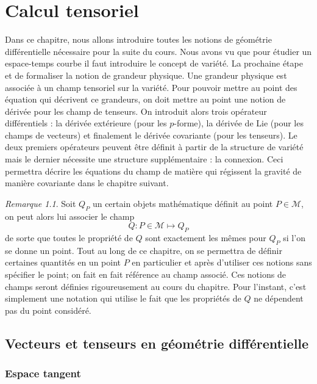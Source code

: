 \documentclass[a4paper,11pt]{report}
\theoremstyle{definition}
\theoremstyle{plain}
\theoremstyle{definition}
\theoremstyle{remark}
\newtheorem{rmk}{Remarque}[chapter]
\newcommand{\M}{\mathscr{M}}
\begin{document}
\chapter{Calcul tensoriel}

    Dans ce chapitre, nous allons introduire toutes les notions de géométrie différentielle nécessaire pour la suite du cours. Nous avons vu que pour étudier un espace-temps courbe il faut introduire le concept de variété. La prochaine étape et de formaliser la notion de grandeur physique. Une grandeur physique est associée à un champ tensoriel sur la variété. Pour pouvoir mettre au point des équation qui décrivent ce grandeurs, on doit mettre au point une notion de dérivée pour les champ de tenseurs. On introduit alors trois opérateur différentiels : la dérivée extérieure (pour les $p$-forme), la dérivée de Lie (pour les champs de vecteurs) et finalement le dérivée covariante (pour les tenseurs). Le deux premiers opérateurs peuvent être définit à partir de la structure de variété mais le dernier nécessite une structure supplémentaire : la connexion. Ceci permettra décrire les équations du champ de matière qui régissent la gravité de manière covariante dans le chapitre suivant.
    
    \begin{rmk}
        Soit $Q_P$ un certain objets mathématique définit au point $P\in\M$, on peut alors lui associer le champ
        \begin{equation*}
            Q:P\in\M\mapsto Q_P
        \end{equation*}
        de sorte que toutes le propriété de $Q$ sont exactement les mêmes pour $Q_P$ si l'on se donne un point. Tout au long de ce chapitre, on se permettra de définir certaines quantités en un point $P$ en particulier et après d'utiliser ces notions sans spécifier le point; on fait en fait référence au champ associé. Ces notions de champs seront définies rigoureusement au cours du chapitre. Pour l'instant, c'est simplement une notation qui utilise le fait que les propriétés de $Q$ ne dépendent pas du point considéré.
    \end{rmk}
    
        \section{Vecteurs et tenseurs en géométrie différentielle}
        
            \subsection{Espace tangent}
                
\end{document}
